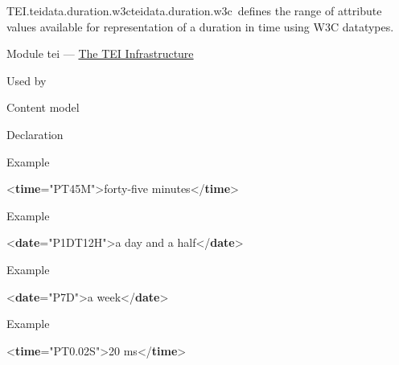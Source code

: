 \begin{reflist}
\item[]\begin{specHead}{TEI.teidata.duration.w3c}{teidata.duration.w3c} defines the range of attribute values available for representation of a duration in time using W3C datatypes.\end{specHead} 
    \item[{Module}]
  tei — \hyperref[ST]{The TEI Infrastructure}
    \item[{Used by}]
  
    \item[{Content model}]
    \item[{Declaration}]
    \item[{Example}]
  \leavevmode\bgroup{}\exampleFont \begin{shaded}\noindent\mbox{}{<\textbf{time}\hspace*{1em}{dur}="{PT45M}">}forty-five minutes{</\textbf{time}>}\end{shaded}\egroup 


    \item[{Example}]
  \leavevmode\bgroup{}\exampleFont \begin{shaded}\noindent\mbox{}{<\textbf{date}\hspace*{1em}{dur}="{P1DT12H}">}a day and a half{</\textbf{date}>}\end{shaded}\egroup 


    \item[{Example}]
  \leavevmode\bgroup{}\exampleFont \begin{shaded}\noindent\mbox{}{<\textbf{date}\hspace*{1em}{dur}="{P7D}">}a week{</\textbf{date}>}\end{shaded}\egroup 


    \item[{Example}]
  \leavevmode\bgroup{}\exampleFont \begin{shaded}\noindent\mbox{}{<\textbf{time}\hspace*{1em}{dur}="{PT0.02S}">}20 ms{</\textbf{time}>}\end{shaded}\egroup 



\end{reflist}
